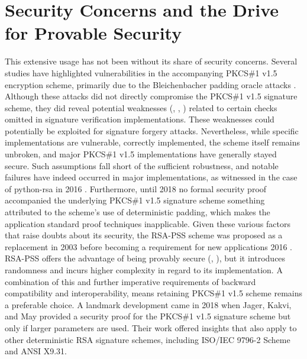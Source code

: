 \documentclass[]{final_report}
\theoremstyle{definition}
\begin{document}
\section{Security Concerns and the Drive for Provable Security}
This extensive usage has not been without its share of security concerns. Several studies \cite{bleichenbacher1998chosen, coppersmith1996low, coron2000new, 10.1007/978-3-540-45238-6_33, degabriele2012joint, bardou2012efficient, meyer2014revisiting, zhang2014cross, jager2015security, jager2015practical, bock2018return} have highlighted vulnerabilities in the accompanying PKCS\#1 v1.5 encryption scheme, primarily due to the Bleichenbacher padding oracle attacks \cite{bleichenbacher1998chosen}. Although these attacks did not directly compromise the PKCS\#1 v1.5 signature scheme, they did reveal potential weaknesses (\cite{finney2006bleichenbacher}, \cite{kuhn2008variants}, \cite{cve-2006-4790, cve-2006-4340, bugzilla-1064636, intel-berserk-vulnerability, josefsson-signature-forgery, valsorda-bleichenbacher-forgery}) related to certain checks omitted in signature verification implementations. These weaknesses could potentially be exploited for signature forgery attacks. Nevertheless, while specific implementations are vulnerable, correctly implemented, the scheme itself remains unbroken, and major PKCS\#1 v1.5 implementations have generally stayed secure.
Such assumptions fall short of the sufficient robustness, and notable failures have indeed occurred in major implementations, as witnessed in the case of python-rsa in 2016  \cite{valsorda-bleichenbacher-forgery}. Furthermore, until 2018 no formal security proof accompanied the underlying PKCS\#1 v1.5 signature scheme something attributed to the scheme's use of deterministic padding, which makes the application standard proof techniques inapplicable. Given these various factors that raise doubts about its security, the RSA-PSS scheme was proposed as a replacement in 2003 \cite{rfc3447} before becoming a requirement for new applications 2016 \cite{rfc8017}. RSA-PSS offers the advantage of being provably secure  (\cite{bellare1996exact}, \cite{jonsson2001security}), but it introduces randomness and incurs higher complexity in regard to its implementation. A combination of this and further imperative requirements of backward compatibility and interoperability, means retaining PKCS\#1 v1.5 scheme remains a preferable choice.
A landmark development came in 2018 when Jager, Kakvi, and May \cite{jager2018security} provided a security proof for the PKCS\#1 v1.5 signature scheme but only if larger parameters are used. Their work offered insights that also apply to other deterministic RSA signature schemes, including ISO/IEC 9796-2 Scheme and ANSI X9.31.
\end{document}
